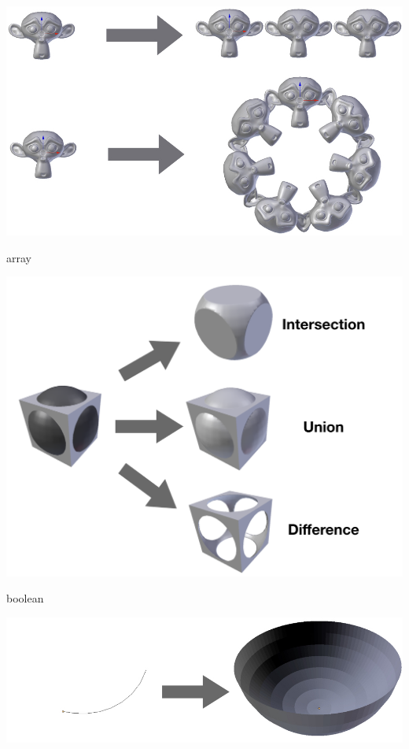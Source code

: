 \begin{figureth}
	\begin{subfigureth}{0.45\textwidth}
		\includegraphics[width=\linewidth]{images/array}
		\caption{\gls{array}}
		\hfill
		\qquad
	\end{subfigureth}
	\qquad
	\begin{subfigureth}{0.45\textwidth}
		\includegraphics[width=\linewidth]{images/boolean}
		\caption{\gls{boolean}}
		\qquad
	\end{subfigureth} 
	\begin{subfigureth}{0.45\textwidth}
		\includegraphics[width=\linewidth]{images/screw}

\end{subfigureth}
\end{figureth}
